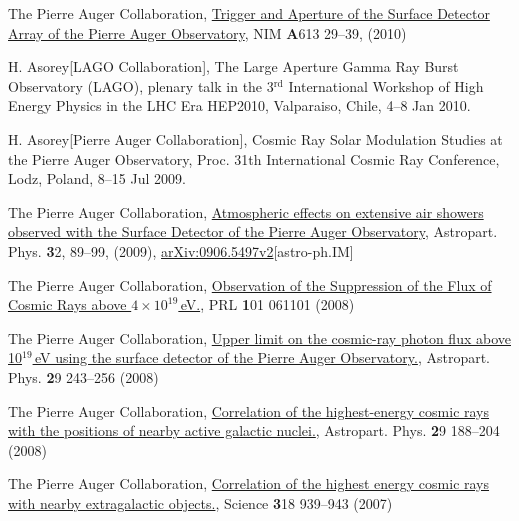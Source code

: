 \begin{etaremune}
\item {}The Pierre Auger Collaboration,
\href{http://dx.doi.org/10.1016/j.nima.2009.11.018}{{Trigger and Aperture
of the Surface Detector Array of the Pierre Auger Observatory}}, NIM {\textbf A613}
29--39, (2010)

\item {}H. Asorey[LAGO Collaboration], {{The Large Aperture Gamma Ray
Burst Observatory (LAGO)}}, plenary talk in the 3$^{\mathrm{rd}}$ International Workshop of
High Energy Physics in the LHC Era HEP2010, Valparaiso, Chile, 4--8 Jan 2010.

\item {}H. Asorey[Pierre Auger Collaboration], {{Cosmic Ray Solar
Modulation Studies at the Pierre Auger Observatory}}, \en Proc.
31th
International Cosmic Ray Conference, Lodz, Poland, 8--15 Jul 2009.

\item {} The Pierre Auger Collaboration,
\href{http://dx.doi.org/10.1016/j.astropartphys.2009.06.004}{{Atmospheric
effects on extensive air showers observed with the Surface Detector of the
Pierre Auger Observatory}}, Astropart.
Phys. {\textbf 32}, 89--99, (2009),
\href{http://arxiv.org/abs/0906.5497/}{arXiv:0906.5497v2}[astro-ph.IM]

\item {}The Pierre Auger Collaboration,
\href{http://dx.doi.org/10.1103/PhysRevLett.101.061101}{{Observation of
the Suppression of the Flux of Cosmic Rays above $4\times10^{19}$\,eV.}}, PRL
{\textbf 101} 061101 (2008)

\item {}The Pierre Auger Collaboration,
\href{http://dx.doi.org/10.1016/j.astropartphys.2008.01.003}{{Upper limit
on the cosmic-ray photon flux above 10$^{19}$\,eV using the surface detector of
the Pierre Auger Observatory.}}, Astropart.
Phys. {\textbf 29} 243--256 (2008)

\item {}The Pierre Auger Collaboration,
\href{http://dx.doi.org/10.1016/j.astropartphys.2008.01.002}{{Correlation
of the highest-energy cosmic rays with the positions of nearby active galactic
nuclei.}}, Astropart.
Phys. {\textbf 29} 188--204 (2008)

\item {}The Pierre Auger Collaboration,
\href{http://dx.doi.org/10.1126/science.1151124}{{Correlation of the
highest energy cosmic rays with nearby extragalactic objects.}}, Science {\textbf
318} 939--943 (2007)


\end{etaremune}
